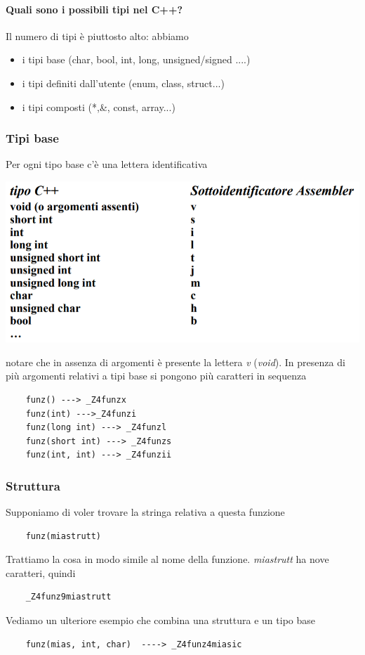 \paragraph{Quali sono i possibili tipi nel C++?} Il numero di tipi è piuttosto alto: abbiamo 
\begin{itemize}
	\item i tipi base (char, bool, int, long, unsigned/signed ....)
	\item i tipi definiti dall'utente (enum, class, struct...)
	\item i tipi composti (*,\&, const, array...)
\end{itemize}
\subsubsection{Tipi base} Per ogni tipo base c'è una lettera identificativa
\begin{center}
	\includegraphics[scale=0.70]{img/38.PNG}
\end{center}  
notare che in assenza di argomenti è presente la lettera \emph{v} (\emph{void}). In presenza di più argomenti relativi a tipi base si pongono più caratteri in sequenza
\begin{verbatim}
	funz() ---> _Z4funzx
	funz(int) --->_Z4funzi
	funz(long int) ---> _Z4funzl
	funz(short int) ---> _Z4funzs
	funz(int, int) ---> _Z4funzii
\end{verbatim}
\subsubsection{Struttura} Supponiamo di voler trovare la stringa relativa a questa funzione
\begin{verbatim}
	funz(miastrutt)
\end{verbatim}
Trattiamo la cosa in modo simile al nome della funzione. \emph{miastrutt} ha nove caratteri, quindi
\begin{verbatim}
	_Z4funz9miastrutt
\end{verbatim}
Vediamo un ulteriore esempio che combina una struttura e un tipo base
\begin{verbatim}
	funz(mias, int, char)  ----> _Z4funz4miasic
\end{verbatim}
